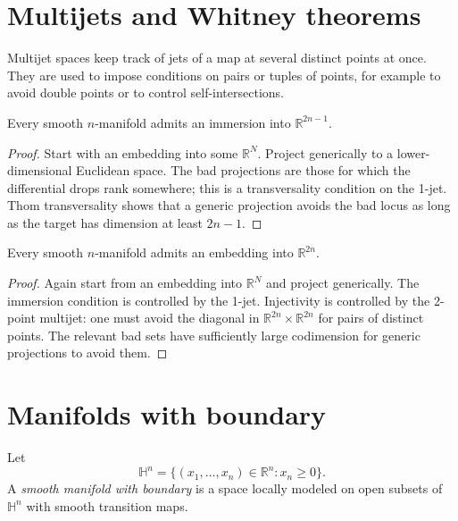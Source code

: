 \section{Multijets and Whitney theorems}
\label{section-multijets-whitney-theorems}

\noindent
Multijet spaces keep track of jets of a map
at several distinct points at once.  They are
used to impose conditions on pairs or tuples
of points, for example to avoid double points
or to control self-intersections.

\begin{theorem}
\label{theorem-whitney-immersion}
Every smooth $n$-manifold admits an immersion
into $\mathbb R^{2n-1}$.
\end{theorem}

\begin{proof}
Start with an embedding into some
$\mathbb R^N$.  Project generically to a
lower-dimensional Euclidean space.  The bad
projections are those for which the
differential drops rank somewhere; this is a
transversality condition on the 1-jet.  Thom
transversality shows that a generic
projection avoids the bad locus as long as
the target has dimension at least $2n-1$.
\end{proof}

\begin{theorem}
\label{theorem-whitney-embedding}
Every smooth $n$-manifold admits an embedding
into $\mathbb R^{2n}$.
\end{theorem}

\begin{proof}
Again start from an embedding into
$\mathbb R^N$ and project generically.  The
immersion condition is controlled by the
1-jet.  Injectivity is controlled by the
2-point multijet: one must avoid the diagonal
in $\mathbb R^{2n}\times\mathbb R^{2n}$ for
pairs of distinct points.  The relevant bad
sets have sufficiently large codimension for
generic projections to avoid them.
\end{proof}

\section{Manifolds with boundary}
\label{section-manifolds-with-boundary}

\begin{definition}
\label{definition-half-space}
Let
$$
\mathbb H^n=\{(x_1,\ldots,x_n)\in
\mathbb R^n:x_n\geq 0\}.
$$
A {\it smooth manifold with boundary} is a
space locally modeled on open subsets of
$\mathbb H^n$ with smooth transition maps.
\end{definition}

